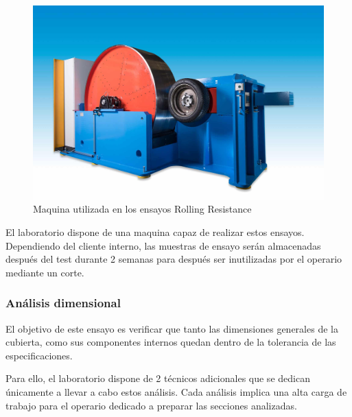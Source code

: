 \begin{figure}
	\begin{center}
		\includegraphics[width=\textwidth]{fig/2_rr_machine}
	\end{center}
	\caption{Maquina utilizada en los ensayos Rolling Resistance}
	\label{fig:2_rr_machine}
\end{figure}

El laboratorio dispone de una maquina capaz de realizar estos ensayos.
Dependiendo del cliente interno, las muestras de ensayo serán almacenadas
después del test durante 2 semanas
para después ser inutilizadas por el operario mediante un corte.

\subsubsection{Análisis dimensional}
El objetivo de este ensayo es verificar que
tanto las dimensiones generales de la cubierta,
como sus componentes internos
quedan dentro de la tolerancia de las especificaciones.

Para ello, el laboratorio dispone de 2 técnicos adicionales
que se dedican únicamente a llevar a cabo estos análisis.
Cada análisis implica una alta carga de trabajo
para el operario dedicado a preparar las secciones analizadas.
